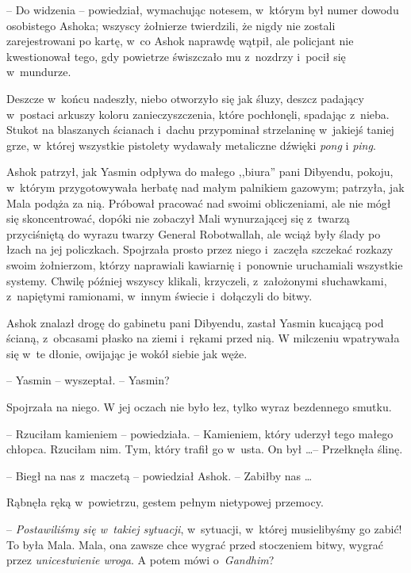 \documentclass[oneside,polish,11pt,rmheadings]{mwbk}
\begin{document}
-- Do widzenia -- powiedział, wymachując notesem, w~którym był numer dowodu osobistego Ashoka; wszyscy żołnierze twierdzili, że nigdy nie zostali zarejestrowani po kartę, w~co Ashok naprawdę wątpił, ale policjant nie kwestionował tego, gdy powietrze świszczało mu z~nozdrzy i~pocił się w~mundurze. 

Deszcze w~końcu nadeszły, niebo otworzyło się jak śluzy, deszcz padający w~postaci arkuszy koloru zanieczyszczenia, które pochłonęli, spadając z~nieba. Stukot na blaszanych ścianach i~dachu przypominał strzelaninę w~jakiejś taniej grze, w~której wszystkie pistolety wydawały metaliczne dźwięki \textit{pong }i \textit{ping}.

Ashok patrzył, jak Yasmin odpływa do małego ,,biura'' pani Dibyendu, pokoju, w~którym przygotowywała herbatę nad małym palnikiem gazowym; patrzyła, jak Mala podąża za nią. Próbował pracować nad swoimi obliczeniami, ale nie mógł się skoncentrować, dopóki nie zobaczył Mali wynurzającej się z~twarzą przyciśniętą do wyrazu twarzy General Robotwallah, ale wciąż były ślady po łzach na jej policzkach. Spojrzała prosto przez niego i~zaczęła szczekać rozkazy swoim żołnierzom, którzy naprawiali kawiarnię i~ponownie uruchamiali wszystkie systemy. Chwilę później wszyscy klikali, krzyczeli, z~założonymi słuchawkami, z~napiętymi ramionami, w~innym świecie i~dołączyli do bitwy.

Ashok znalazł drogę do gabinetu pani Dibyendu, zastał Yasmin kucającą pod ścianą, z~obcasami płasko na ziemi i~rękami przed nią. W milczeniu wpatrywała się w~te dłonie, owijając je wokół siebie jak węże.

-- Yasmin -- wyszeptał. -- Yasmin? 

Spojrzała na niego. W jej oczach nie było łez, tylko wyraz bezdennego smutku. 

-- Rzuciłam kamieniem -- powiedziała. -- Kamieniem, który uderzył tego małego chłopca. Rzuciłam nim. Tym, który trafił go w~usta. On był \ldots  -- Przełknęła ślinę.

-- Biegł na nas z~maczetą -- powiedział Ashok. -- Zabiłby nas \ldots  

Rąbnęła ręką w~powietrzu, gestem pełnym nietypowej przemocy. 

-- \textit{Postawiliśmy się w~takiej sytuacji}, w~sytuacji, w~której musielibyśmy go zabić! To była Mala. Mala, ona zawsze chce wygrać przed stoczeniem bitwy, wygrać przez \textit{unicestwienie wroga}. A potem mówi o~\textit{Gandhim}? 
\end{document}

